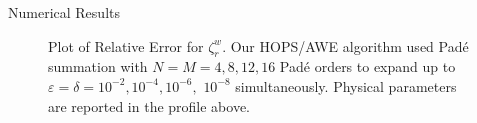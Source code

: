 \begin{section}{Numerical Results}
\begin{figure}[ht]
\vspace{3mm}
\caption{Plot of Relative Error for $\zeta^w_r$. Our HOPS/AWE algorithm used Padé summation with $N=M=4,8,12,16$ Padé orders to expand up to $\varepsilon = \delta = 10^{-2}, 10^{-4},10^{-6},$ $10^{-8}$ simultaneously. Physical parameters are reported in the profile above.}
\end{figure}


\end{section}
